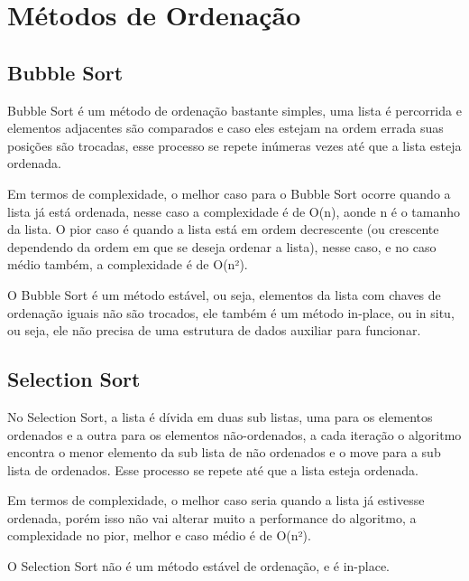 \documentclass{article}
\title{}
\author{}
\date{}
\begin{document}
	
	\maketitle
	
	\section{Métodos de Ordenação}
	
	\subsection{Bubble Sort}
	
	
	 Bubble Sort é um método de ordenação bastante simples, uma lista é percorrida e elementos adjacentes são comparados e caso eles estejam na ordem errada suas posições são trocadas, esse processo se repete inúmeras vezes até que a lista esteja ordenada.
	
	Em termos de complexidade, o melhor caso para o Bubble Sort ocorre quando a lista já está ordenada, nesse caso a complexidade é de O(n), aonde n é o tamanho da lista. O pior caso é quando a lista está em ordem decrescente (ou crescente dependendo da ordem em que se deseja ordenar a lista), nesse caso, e no caso médio também, a complexidade é de O(n²).
	
	O Bubble Sort é um método estável, ou seja, elementos da lista com chaves de ordenação iguais não são trocados, ele também é um método in-place, ou in situ, ou seja, ele não precisa de uma estrutura de dados auxiliar para funcionar.\\
	
	\subsection{Selection Sort}
	
	No Selection Sort, a lista é dívida em duas sub listas, uma para os elementos ordenados e a outra para os elementos não-ordenados, a cada iteração o algoritmo encontra o menor elemento da sub lista de não ordenados e o move para a sub lista de ordenados. Esse processo se repete até que a lista esteja ordenada.
	
	Em termos de complexidade, o melhor caso seria quando a lista já estivesse ordenada, porém isso não vai alterar muito a performance do algoritmo, a complexidade no pior, melhor e caso médio é de O(n²).
	
	O Selection Sort não é um método estável de ordenação, e é in-place.\\
	
\end{document}
